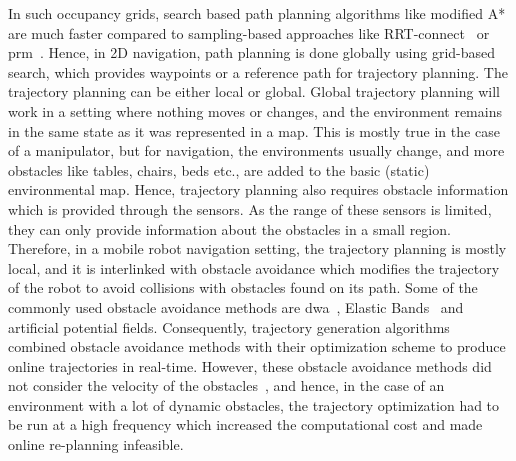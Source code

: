 In such occupancy grids, search based path planning algorithms like modified A* \cite{warren1993fast} are much faster compared to sampling-based approaches like RRT-connect~\cite{kuffner2000rrt} or \acrshort{prm}~\cite{kavraki1996probabilistic}. Hence, in 2D navigation, path planning is done globally using grid-based search, which provides waypoints or a reference path for trajectory planning. The trajectory planning can be either local or global. Global trajectory planning will work in a setting where nothing moves or changes, and the environment remains in the same state as it was represented in a map. This is mostly true in the case of a manipulator, but for navigation, the environments usually change, and more obstacles like tables, chairs, beds etc., are added to the basic (static) environmental map. Hence, trajectory planning also requires obstacle information which is provided through the sensors. As the range of these sensors is limited, they can only provide information about the obstacles in a small region. Therefore, in a mobile robot navigation setting, the trajectory planning is mostly local, and it is interlinked with obstacle avoidance which modifies the trajectory of the robot to avoid collisions with obstacles found on its path. Some of the commonly used obstacle avoidance methods are \acrfull{dwa}~\cite{fox1997dynamic}, Elastic Bands~\cite{quinlan1993elastic} and artificial potential fields. Consequently, trajectory generation algorithms combined obstacle avoidance methods with their optimization scheme to produce online trajectories in real-time. However, these obstacle avoidance methods did not consider the velocity of the obstacles~\cite{cai2020mobile}, and hence, in the case of an environment with a lot of dynamic obstacles, the trajectory optimization had to be run at a high frequency which increased the computational cost and made online re-planning infeasible. 

